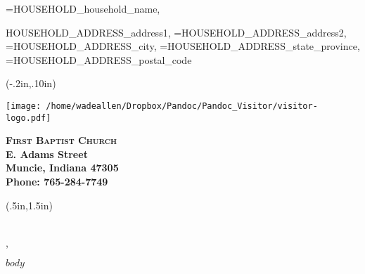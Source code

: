 \documentclass[12pt,letterpaper]{article}
\begin{document}
{\name=HOUSEHOLD_household_name, \address=HOUSEHOLD_ADDRESS_address1, \addresstwo=HOUSEHOLD_ADDRESS_address2, \city=HOUSEHOLD_ADDRESS_city, \state=HOUSEHOLD_ADDRESS_state_province, \zip=HOUSEHOLD_ADDRESS_postal_code}{
  
\thispagestyle{empty}

\begin{textblock*}{3in}(-.2in,.10in)
  \begin{minipage}{.5in}
   \texttt{[image: /home/wadeallen/Dropbox/Pandoc/Pandoc\_Visitor/visitor-logo.pdf]}
  \end{minipage}
  \begin{minipage}{2in}
  \noindent \bfseries \textsc{First Baptist Church} \\
   E. Adams Street \\
  Muncie, Indiana 47305 \\
  Phone: 765-284-7749
  \end{minipage}
\end{textblock*}


{
 \begin{textblock*}{3in}(.5in,1.5in)
 \noindent \bfseries \textsc{\name} \\
 \normalfont \address \addresstwo \\
 \city, \state \zip \\
 \end{textblock*}
}



\vspace{5in}

$body$

\pagebreak

}
\end{document}
